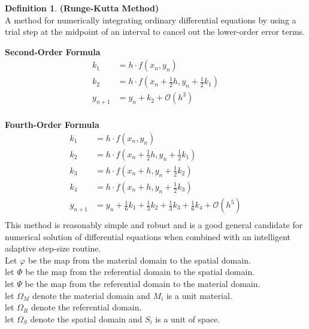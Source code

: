 \documentclass[12pt, a4paper, fleqn]{article}
\theoremstyle{definition}
\newtheorem*{definition}{Definition}
\theoremstyle{remark}
\theoremstyle{definition}
\newcommand{\?}{\stackrel{?}{=}}
\renewcommand{\bf}[1]{\textbf{#1}}
\begin{document}
\begin{definition}\bf{(Runge-Kutta Method)}\\
A method for numerically integrating ordinary differential equations by using a trial step at the midpoint of an interval to cancel out the lower-order error terms.
\end{definition}

\bf{Second-Order Formula}
\begin{align*}
{k}_{1} &= h\cdot f({x}_{n}, {y}_{n})\\
{k}_{2} &= h \cdot f \left( {x}_{n} + \frac{1}{2} h, {y}_{n} + \frac{1}{2} {k}_{1} \right)\\
{y}_{n+1} &= {y}_{n} + {k}_{2} + \mathcal{O} \left( {h}^{3} \right)\\
\end{align*}

\bf{Fourth-Order Formula}
\begin{align*}
{k}_{1} &= h\cdot f({x}_{n}, {y}_{n})\\
{k}_{2} &= h \cdot f \left( {x}_{n} + \frac{1}{2} h, {y}_{n} + \frac{1}{2} {k}_{1} \right)\\
{k}_{3} &= h \cdot f \left( {x}_{n} + h, {y}_{n} + \frac{1}{2} {k}_{2} \right)\\
{k}_{4} &= h \cdot f \left( {x}_{n} + h, {y}_{n} + \frac{1}{2} {k}_{3} \right)\\
{y}_{n+1} &= {y}_{n} + \frac{1}{6}{k}_{1} + \frac{1}{3}{k}_{2}+ \frac{1}{3}{k}_{3}+ \frac{1}{6}{k}_{4} + \mathcal{O} \left( {h}^{5} \right)\\
\end{align*}
This method is reasonably simple and robust and is a good general candidate for numerical solution of differential equations when combined with an intelligent adaptive step-size routine. \\

\noindent Let $\varphi$ be the map from the material domain to the spatial domain. \\
let $\Phi$ be the map from the referential domain to the spatial domain. \\
let $\Psi$ be the map from the referential domain to the material domain. \\
let ${\Omega}_{M}$ denote the material domain and ${M}_{i}$ is a unit material. \\
let ${\Omega}_{R}$ denote the referential domain. \\
let ${\Omega}_{S}$ denote the spatial domain and ${S}_{i}$ is a unit of space. \\
\end{document}
